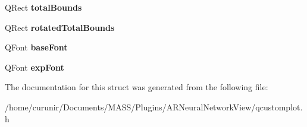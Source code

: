 \begin{DoxyCompactItemize}
\item 
Q\+Rect {\bfseries total\+Bounds}\hypertarget{struct_q_c_p_axis_painter_private_1_1_tick_label_data_afbb3163cf4c628914f1b703945419ea5}{}\label{struct_q_c_p_axis_painter_private_1_1_tick_label_data_afbb3163cf4c628914f1b703945419ea5}

\item 
Q\+Rect {\bfseries rotated\+Total\+Bounds}\hypertarget{struct_q_c_p_axis_painter_private_1_1_tick_label_data_aa4d38c5ea47c9184a78ee33ae7f1012e}{}\label{struct_q_c_p_axis_painter_private_1_1_tick_label_data_aa4d38c5ea47c9184a78ee33ae7f1012e}

\item 
Q\+Font {\bfseries base\+Font}\hypertarget{struct_q_c_p_axis_painter_private_1_1_tick_label_data_a0d4958a706debaa8d19a9b65fc090d56}{}\label{struct_q_c_p_axis_painter_private_1_1_tick_label_data_a0d4958a706debaa8d19a9b65fc090d56}

\item 
Q\+Font {\bfseries exp\+Font}\hypertarget{struct_q_c_p_axis_painter_private_1_1_tick_label_data_adc10767ebcb719d6927c012a38b9d933}{}\label{struct_q_c_p_axis_painter_private_1_1_tick_label_data_adc10767ebcb719d6927c012a38b9d933}

\end{DoxyCompactItemize}


The documentation for this struct was generated from the following file\+:\begin{DoxyCompactItemize}
\item 
/home/curunir/\+Documents/\+M\+A\+S\+S/\+Plugins/\+A\+R\+Neural\+Network\+View/qcustomplot.\+h\end{DoxyCompactItemize}
